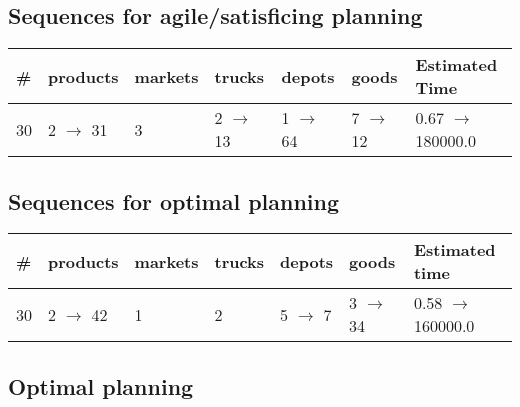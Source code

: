 \documentclass{article}
\begin{document}
                         \subsection*{Sequences for agile/satisficing planning}

                        \begin{center}
                        \begin{tabular}{@{}l|l|l|l|l|l|l@{}}
                        \# & products & markets & trucks & depots & goods & Estimated Time\\\midrule
                        30&2 $\rightarrow$ 31&3&2 $\rightarrow$ 13&1 $\rightarrow$ 64&7 $\rightarrow$ 12&0.67 $\rightarrow$ 180000.0
                        \end{tabular}
                        \end{center}
                    
                            \subsection*{Sequences for optimal planning}

                            \begin{center}
                            \begin{tabular}{@{}l|l|l|l|l|l|l@{}}
                            \# & products & markets & trucks & depots & goods & Estimated time\\\midrule
                            30&2 $\rightarrow$ 42&1&2&5 $\rightarrow$ 7&3 $\rightarrow$ 34&0.58 $\rightarrow$ 160000.0
                            \end{tabular}
                            \end{center}
                    
                                \subsection*{Optimal planning}
                                
\end{document}
